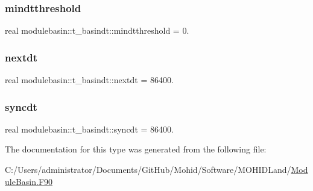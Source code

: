 \subsubsection{\texorpdfstring{mindtthreshold}{mindtthreshold}}
{\footnotesize\ttfamily real modulebasin\+::t\+\_\+basindt\+::mindtthreshold = 0.\hspace{0.3cm}{\ttfamily [private]}}

\mbox{\label{structmodulebasin_1_1t__basindt_aa53f42df5d30e2cc1423cb1d78319603}} 
\subsubsection{\texorpdfstring{nextdt}{nextdt}}
{\footnotesize\ttfamily real modulebasin\+::t\+\_\+basindt\+::nextdt = 86400.\hspace{0.3cm}{\ttfamily [private]}}

\mbox{\label{structmodulebasin_1_1t__basindt_ae99b9d619973de826ea4b0cd3117c4f4}} 
\subsubsection{\texorpdfstring{syncdt}{syncdt}}
{\footnotesize\ttfamily real modulebasin\+::t\+\_\+basindt\+::syncdt = 86400.\hspace{0.3cm}{\ttfamily [private]}}



The documentation for this type was generated from the following file\+:\begin{DoxyCompactItemize}
\item 
C\+:/\+Users/administrator/\+Documents/\+Git\+Hub/\+Mohid/\+Software/\+M\+O\+H\+I\+D\+Land/\mbox{\hyperlink{_module_basin_8_f90}{Module\+Basin.\+F90}}\end{DoxyCompactItemize}
